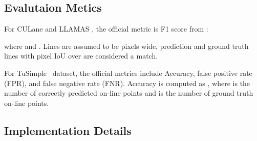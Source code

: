 \documentclass[10pt,twocolumn,letterpaper]{article}
\begin{document}
\subsection{Evalutaion Metics}
For CULane \cite{pan2018spatial} and LLAMAS \cite{llamas2019}, the official metric is F1 score from \cite{pan2018spatial}:

where  and . Lines are assumed to be  pixels wide, prediction and ground truth lines with pixel IoU over  are considered a match.

For TuSimple~\cite{tusimple} dataset, the official metrics include Accuracy, false positive rate (FPR), and false negative rate (FNR). 
Accuracy is computed as ,
where  is the number of correctly predicted on-line points and  is the number of ground truth on-line points.

\subsection{Implementation Details}
\label{sec:imple}
\end{document}
